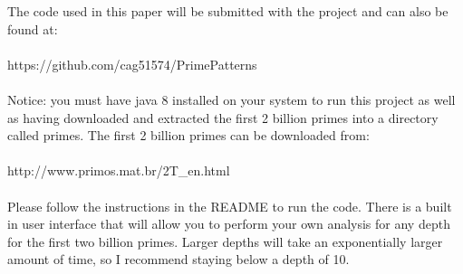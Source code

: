 \documentclass[13pt]{article}
\begin{document}
The code used in this paper will be submitted with the project and can also be found at: \\\\https://github.com/cag51574/PrimePatterns\\
\\Notice: you must have java 8 installed on your system to run this project as well as having downloaded and extracted the first 2 billion primes into a directory called primes.
The first 2 billion primes can be downloaded from:\\\\
http://www.primos.mat.br/2T\_en.html\\\\
Please follow the instructions in the README to run the code.
There is a built in user interface that will allow you to perform your own analysis for any depth for the first two billion primes.
Larger depths will take an exponentially larger amount of time, so I recommend staying below a depth of 10.\\\\
\end{document}

